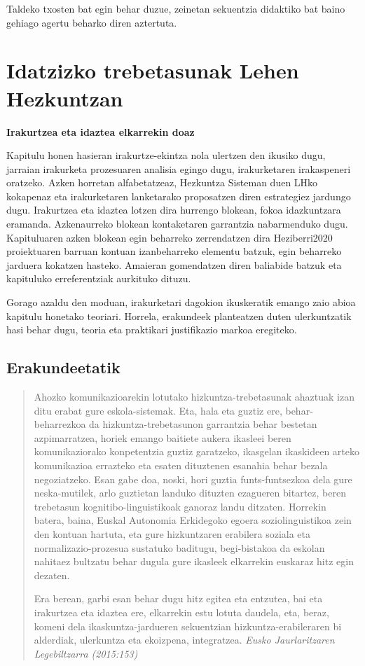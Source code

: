\documentclass[]{book}
\begin{document}
Taldeko txosten bat egin behar duzue, zeinetan sekuentzia didaktiko bat baino gehiago agertu beharko diren aztertuta.

\hypertarget{idatzizko-trebetasunak-lehen-hezkuntzan}{%
\chapter{Idatzizko trebetasunak Lehen Hezkuntzan}\label{idatzizko-trebetasunak-lehen-hezkuntzan}}

\textbf{Irakurtzea eta idaztea elkarrekin doaz}

Kapitulu honen hasieran irakurtze-ekintza nola ulertzen den ikusiko dugu, jarraian irakurketa prozesuaren analisia egingo dugu, irakurketaren irakaspeneri oratzeko. Azken horretan alfabetatzeaz, Hezkuntza Sisteman duen LHko kokapenaz eta irakurketaren lanketarako proposatzen diren estrategiez jardungo dugu. Irakurtzea eta idaztea lotzen dira hurrengo blokean, fokoa idazkuntzara eramanda. Azkenaurreko blokean kontaketaren garrantzia nabarmenduko dugu. Kapituluaren azken blokean egin beharreko zerrendatzen dira Heziberri2020 proiektuaren barruan kontuan izanbeharreko elementu batzuk, egin beharreko jarduera kokatzen hasteko. Amaieran gomendatzen diren baliabide batzuk eta kapituluko erreferentziak aurkituko dituzu.

Gorago azaldu den moduan, irakurketari dagokion ikuskeratik emango zaio abioa kapitulu honetako teoriari. Horrela, erakundeek planteatzen duten ulerkuntzatik hasi behar dugu, teoria eta praktikari justifikazio markoa eregiteko.

\hypertarget{erakundeetatik}{%
\section{Erakundeetatik}\label{erakundeetatik}}

\begin{quote}
Ahozko komunikazioarekin lotutako hizkuntza-trebetasunak ahaztuak izan ditu erabat gure eskola-sistemak. Eta, hala eta guztiz ere, behar-beharrezkoa da hizkuntza-trebetasunon garrantzia behar bestetan azpimarratzea, horiek emango baitiete aukera ikasleei beren komunikaziorako konpetentzia guztiz garatzeko, ikasgelan ikaskideen arteko komunikazioa errazteko eta esaten dituztenen esanahia behar bezala negoziatzeko. Esan gabe doa, noski, hori guztia funts-funtsezkoa dela gure neska-mutilek, arlo guztietan landuko dituzten ezagueren bitartez, beren trebetasun kognitibo-linguistikoak ganoraz landu ditzaten. Horrekin batera, baina, Euskal Autonomia Erkidegoko egoera soziolinguistikoa zein den kontuan hartuta, eta gure hizkuntzaren erabilera soziala eta normalizazio-prozesua sustatuko baditugu, begi-bistakoa da eskolan nahitaez bultzatu behar dugula gure ikasleek elkarrekin euskaraz hitz egin dezaten.

Era berean, garbi esan behar dugu hitz egitea eta entzutea, bai eta irakurtzea eta idaztea ere, elkarrekin estu lotuta daudela, eta, beraz, komeni dela ikaskuntza-jardueren sekuentzian hizkuntza-erabileraren bi alderdiak, ulerkuntza eta ekoizpena, integratzea. \emph{Eusko Jaurlaritzaren Legebiltzarra (2015:153)}
\end{quote}
\end{document}
